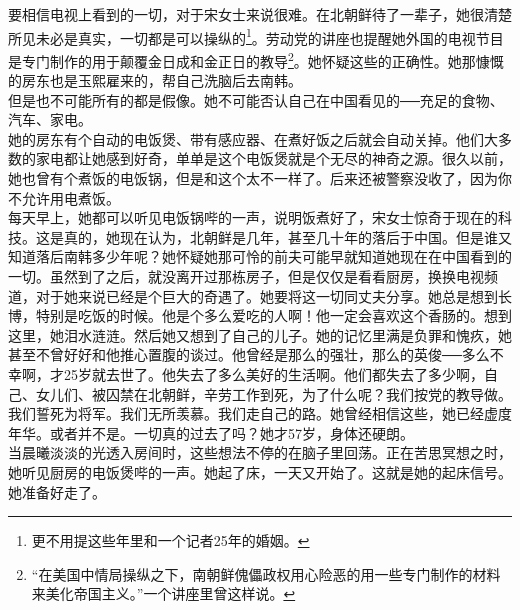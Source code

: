 \begin{multicols}{\theparacolNo}
要相信电视上看到的一切，对于宋女士来说很难。在北朝鲜待了一辈子，她很清楚所见未必是真实，一切都是可以操纵的\footnote{更不用提这些年里和一个记者25年的婚姻。}。劳动党的讲座也提醒她外国的电视节目是专门制作的用于颠覆金日成和金正日的教导\footnote{“在美国中情局操纵之下，南朝鲜傀儡政权用心险恶的用一些专门制作的材料来美化帝国主义。”一个讲座里曾这样说。}。她怀疑这些的正确性。她那慷慨的房东也是玉熙雇来的，帮自己洗脑后去南韩。\\

但是也不可能所有的都是假像。她不可能否认自己在中国看见的──充足的食物、汽车、家电。\\

她的房东有个自动的电饭煲、带有感应器、在煮好饭之后就会自动关掉。他们大多数的家电都让她感到好奇，单单是这个电饭煲就是个无尽的神奇之源。很久以前，她也曾有个煮饭的电饭锅，但是和这个太不一样了。后来还被警察没收了，因为你不允许用电煮饭。\\

每天早上，她都可以听见电饭锅哔的一声，说明饭煮好了，宋女士惊奇于现在的科技。这是真的，她现在认为，北朝鲜是几年，甚至几十年的落后于中国。但是谁又知道落后南韩多少年呢？她怀疑她那可怜的前夫可能早就知道她现在在中国看到的一切。虽然到了之后，就没离开过那栋房子，但是仅仅是看看厨房，换换电视频道，对于她来说已经是个巨大的奇遇了。她要将这一切同丈夫分享。她总是想到长博，特别是吃饭的时候。他是个多么爱吃的人啊！他一定会喜欢这个香肠的。想到这里，她泪水涟涟。然后她又想到了自己的儿子。她的记忆里满是负罪和愧疚，她甚至不曾好好和他推心置腹的谈过。他曾经是那么的强壮，那么的英俊──多么不幸啊，才25岁就去世了。他失去了多么美好的生活啊。他们都失去了多少啊，自己、女儿们、被囚禁在北朝鲜，辛劳工作到死，为了什么呢？我们按党的教导做。我们誓死为将军。我们无所羡慕。我们走自己的路。她曾经相信这些，她已经虚度年华。或者并不是。一切真的过去了吗？她才57岁，身体还硬朗。\\

当晨曦淡淡的光透入房间时，这些想法不停的在脑子里回荡。正在苦思冥想之时，她听见厨房的电饭煲哔的一声。她起了床，一天又开始了。这就是她的起床信号。她准备好走了。\\
\ifnum{}
	\end{multicols}
\fi